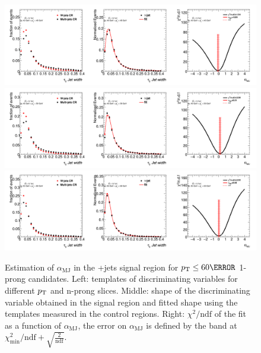 		\begin{figure}
		\begin{center}
		\includegraphics[width=1\textwidth]{chapters/chapter6_HPlus/images/FFs/FFs_FIT_SR_TAUJET_1_40_45.png}
		\includegraphics[width=1\textwidth]{chapters/chapter6_HPlus/images/FFs/FFs_FIT_SR_TAUJET_1_45_50.png}
		\includegraphics[width=1\textwidth]{chapters/chapter6_HPlus/images/FFs/FFs_FIT_SR_TAUJET_1_50_60.png}

		\end{center}
		\caption{
		Estimation of $\alpha_\mathrm{MJ}$ in the \tauhad+jets signal region for $\pt \leq 60 \GeV$ 
		1-prong \tauhad candidates. Left: templates of discriminating variables for different \tauhad $p_{\text{T}}$ 
		and n-prong slices. Middle: shape of the discriminating variable obtained in the signal region and fitted 
		shape using the templates measured in the control regions. Right: $\chi^2/\mathrm{ndf}$ of the fit as a 
		function of $\alpha_\mathrm{MJ}$, the error on $\alpha_\mathrm{MJ}$ is defined by the band at 
		$\chi^2_\mathrm{min}/\mathrm{ndf}+\sqrt{\frac{2}{\mathrm{ndf}}}$.
		}

		\label{fig:mm:Fits:region3_1}
		\end{figure}

